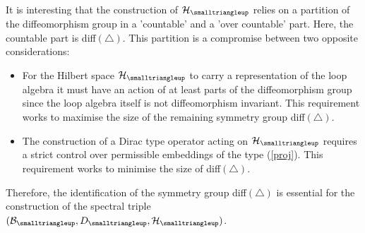 \documentclass[12pt]{article}
\def\cb{{\cal B}}
\def\ch{{\cal H}}
\begin{document}
It is interesting that the construction of $\ch_{\smalltriangleup}$ relies on a partition of the diffeomorphism group in a 'countable' and a 'over countable' part. Here, the countable part is diff$(\triangle)$. This partition is a compromise between two opposite considerations:
\begin{itemize}
\item
For the Hilbert space $\ch_{\smalltriangleup}$ to carry a representation of the loop algebra it must have an action of at least parts of the diffeomorphism group since the loop algebra itself is not diffeomorphism invariant. This requirement works to maximise the size of the remaining symmetry group diff$(\triangle)$.
\item
The construction of a Dirac type operator acting on $\ch_{\smalltriangleup}$ requires a strict control over permissible embeddings of the type (\ref{proj}). This requirement works to minimise the size of diff$(\triangle)$.
\end{itemize}
Therefore, the identification of the symmetry group diff$(\triangle)$ is essential for the construction of the spectral triple $(\cb_{\smalltriangleup},D_{\smalltriangleup},\ch_\smalltriangleup)$.
\end{document}

